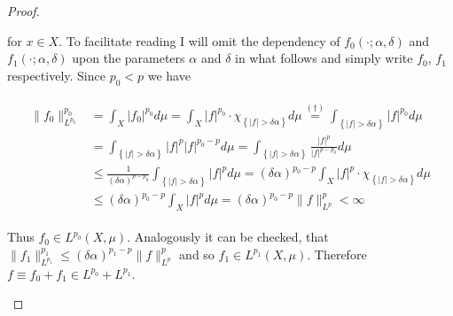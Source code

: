 \begin{proof}
\begin{enumerate}[label = \textbf{(\roman*.)}]
\begin{enumerate}[label = \textbf{\alph*.}]
	for $x \in X$. To facilitate reading I will omit the dependency of $f_0(\cdot;\alpha,\delta)$ and $f_1(\cdot;\alpha,\delta)$ upon the parameters $\alpha$ and $\delta$ in what follows and simply write $f_0$, $f_1$ respectively. Since $p_0 < p$ we have 

	\begin{gather}
		\begin{aligned}
			\|f_0\|^{p_0}_{L^{p_0}} &= \int_{X} \vert f_0\vert^{p_0} d\mu =\int_{X} \vert f \vert^{p_0} \cdot \chi_{\left\{\vert f\vert > \delta\alpha \right\}} d\mu \overset{(\dagger)}{=} \int_{\left\{\vert f \vert > \delta\alpha \right\}} \vert f \vert^{p_0}d\mu\\ 
			&= \int_{\left\{\vert f\vert > \delta\alpha \right\}} \vert f \vert^p \vert f \vert^{p_0 - p} d\mu = \int_{\left\{\vert f\vert > \delta\alpha \right\}} \frac{\vert f \vert^p}{\vert f \vert^{p - p_0}} d\mu\\
			&\leqslant \frac{1}{(\delta\alpha)^{p - p_0}} \int_{\left\{\vert f\vert > \delta\alpha \right\}} \vert f \vert^p d\mu = (\delta\alpha)^{p_0 - p} \int_{X} \vert f \vert^p \cdot \chi_{\left\{\vert f\vert > \delta\alpha \right\}} d\mu\\
			& \leqslant (\delta\alpha)^{p_0 - p} \int_{X} \vert f \vert^p d\mu = (\delta\alpha)^{p_0 - p} \|f\|^p_{L^p} < \infty
		\end{aligned}
		\label{est:f0}
	\end{gather}

	Thus $f_0 \in L^{p_0}(X,\mu)$. Analogously it can be checked, that $\|f_1\|^{p_1}_{L^{p_1}} \leqslant (\delta\alpha)^{p_1 - p}\|f\|_{L^p}^p$ and so $f_1 \in L^{p_1}(X,\mu)$. Therefore $f \equiv f_0 + f_1 \in L^{p_0} + L^{p_1}$.\\
	

\end{enumerate}
\end{enumerate}
\end{proof}
